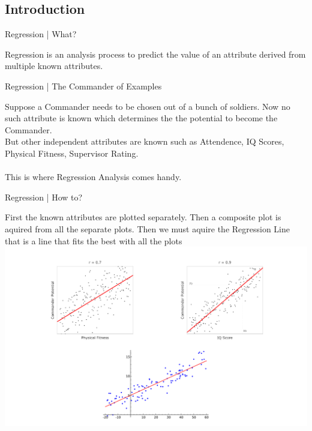\documentclass[10pt]{beamer}
\begin{document}
	\subsection{Introduction}
	\begin{frame}[c]{Regression | What?}
		\begin{center}
			\huge{Regression}
			\Large{ is an}
			\huge{analysis process}
			\Large{ to predict the value of an attribute derived from}
			\huge{ multiple known attributes.}
		\end{center}
	\end{frame}
	
	\begin{frame}[c]{Regression | The Commander of Examples}
		\begin{center}
			\normalsize{Suppose a Commander needs to be chosen out of a bunch of soldiers. Now no such attribute is known which determines the }
			\large{the potential to become the Commander.}
			\normalsize{ \\But other independent attributes are known such as}
			\large{Attendence, IQ Scores, Physical Fitness, Supervisor Rating.}
			\pause		
			\normalsize{\\~\\This is where}
			\Large{ Regression Analysis}
			\normalsize{ comes handy.}
		\end{center}
	\end{frame}
	
	\begin{frame}[t]{Regression | How to?}
		\begin{center}
			\small{First the known attributes are plotted separately. Then a composite plot is aquired from all the separate 						plots. Then we must aquire the
			}
			\large{Regression Line}
			\small{ that is a line that fits the best with all the plots}
			\includegraphics[scale=0.2]{images/ex}			
		\end{center}
	\end{frame}
	
\end{document}
